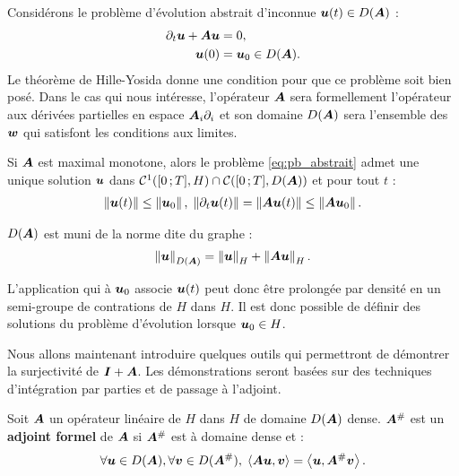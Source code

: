 Considérons le problème d'évolution abstrait d'inconnue
$\bm{u}(t) \in D(\bm{A})$ :
\begin{subequations} \label{eq:pb_abstrait}
	\begin{align}
		\partial_{t} \bm{u} + \bm{A} \bm{u} &= 0 , \\
		\bm{u}(0) &= \bm{u}_{0} \in D(\bm{A}) .
	\end{align}
\end{subequations}
Le théorème de Hille-Yosida donne une condition pour que ce problème soit
bien posé. Dans le cas qui nous intéresse, l'opérateur $\bm{A}$
sera formellement l'opérateur aux dérivées partielles en espace
${\bm{A}_{i}\partial_{i}}$ et son domaine $D(\bm{A})$ sera l'ensemble des $\bm{w}$
qui satisfont les conditions aux limites.

\begin{theorem}
	Si $\bm{A}$ est maximal monotone, alors le problème \eqref{eq:pb_abstrait}
	admet une unique solution $\bm{u}$ dans
	$\mathcal{C}^{1}(\lbrack0\,;T\rbrack,H) \cap \mathcal{C}(\lbrack0\,;T\rbrack,D(\bm{A}))$
	et pour tout $t$ :
	\begin{align}
		\left\Vert\bm{u}(t)\right\Vert \le \left\Vert\bm{u}_0\right\Vert, \;
		\left\Vert\partial_{t} \bm{u}(t)\right\Vert =
		\left\Vert\bm{A} \bm{u}(t)\right\Vert \le \left\Vert\bm{A} \bm{u}_0\right\Vert .
	\end{align}
\end{theorem}

\begin{remark}
	$D(\bm{A})$ est muni de la norme dite du graphe :
	\begin{align}
		\left\Vert\bm{u}\right\Vert_{D(\bm{A})} = \left\Vert\bm{u}\right\Vert_{H} + \left\Vert\bm{A} \bm{u}\right\Vert_{H} .
	\end{align}
\end{remark}

\begin{remark}
	L'application qui à $\bm{u}_0$ associe $\bm{u}(t)$
	peut donc être prolongée par densité en un semi-groupe
	de contrations de $H$ dans $H$.
	Il est donc possible de définir des solutions du problème
	d'évolution lorsque $\bm{u}_0 \in H$.
\end{remark}

Nous allons maintenant introduire quelques outils qui permettront de
démontrer la surjectivité de $\bm{I} + \bm{A}$. Les démonstrations seront basées
sur des techniques d'intégration par parties et de passage à l'adjoint.

\begin{definition}
	Soit $\bm{A}$ un opérateur linéaire de $H$ dans $H$ de domaine $D(\bm{A})$ dense.
	$\bm{A}^{\#}$ est un \textbf{adjoint formel} de $\bm{A}$ si $\bm{A}^{\#}$
	est à domaine dense et :
	\begin{align}
		\forall \bm{u} \in D(\bm{A}), \forall \bm{v} \in D(\bm{A}^{\#}), \;
		\left\langle \bm{A} \bm{u} , \bm{v} \right\rangle
		= \left\langle \bm{u} , \bm{A}^{\#} \bm{v} \right\rangle .
	\end{align}
\end{definition}


